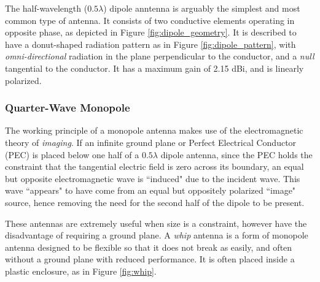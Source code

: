The half-wavelength ($0.5 \lambda$) dipole anntenna is arguably the simplest and most common type of antenna. It consists of two conductive elements operating in opposite phase, as depicted in Figure \ref{fig:dipole_geometry}. It is described to have a donut-shaped radiation pattern as in Figure \ref{fig:dipole_pattern}, with \textit{omni-directional} radiation in the plane perpendicular to the conductor, and a \textit{null} tangential to the conductor. It has a maximum gain of 2.15 dBi, and is linearly polarized. \cite{site-antennaTheory}

\subsubsection{Quarter-Wave Monopole}\label{monopole}
The working principle of a monopole antenna makes use of the electromagnetic theory of \textit{imaging}. If an infinite ground plane or Perfect Electrical Conductor (PEC) is placed below one half of a $0.5 \lambda$ dipole antenna, since the PEC holds the constraint that the tangential electric field is zero across its boundary, an equal but opposite electromagnetic wave is ``induced" due to the incident wave. This wave ``appears" to have come from an equal but oppositely polarized ``image" source, hence removing the need for the second half of the dipole to be present.

These antennas are extremely useful when size is a constraint, however have the disadvantage of requiring a ground plane. A \textit{whip} antenna is a form of monopole antenna designed to be flexible so that it does not break as easily, and often without a ground plane with reduced performance. It is often placed inside a plastic enclosure, as in Figure \ref{fig:whip}. \cite{site-antennaTheory}

